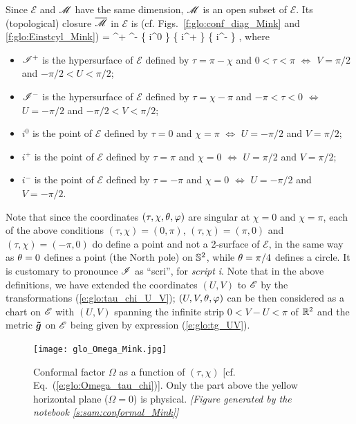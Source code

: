 Since $\mathscr{E}$ and $\mathscr{M}$ have the same dimension, $\mathscr{M}$ is an open subset of $\mathscr{E}$.
Its (topological) closure $\overline{\mathscr{M}}$ in $\mathscr{E}$ is (cf.
Figs.~\ref{f:glo:conf_diag_Mink} and \ref{f:glo:Einstcyl_Mink})
\be
    \overline{\M} = \M \cup \scri^+ \cup \scri^- \cup \left\{ i^0 \right\} \cup
            \left\{ i^+ \right\} \cup \left\{ i^- \right\} ,
\ee
where
\begin{itemize}
\item $\mathscr{I}^+$ is the hypersurface of $\mathscr{E}$ defined by
$\tau = \pi - \chi$ and $0 < \tau < \pi$ $\iff$
$V=\pi/2$ and $-\pi/2< U < \pi/2$;
\item $\mathscr{I}^-$ is the hypersurface of $\mathscr{E}$ defined by
$\tau = \chi - \pi $ and $-\pi  < \tau < 0$ $\iff$
$U=-\pi/2$ and $-\pi/2< V < \pi/2$;
\item $i^0$ is the point of $\mathscr{E}$ defined by $\tau=0$ and $\chi=\pi$
$\iff$ $U=-\pi/2$ and $V=\pi/2$;
\item $i^+$ is the point of $\mathscr{E}$ defined by $\tau=\pi$ and $\chi=0$
$\iff$ $U=\pi/2$ and $V=\pi/2$;
\item $i^-$ is the point of $\mathscr{E}$ defined by $\tau=-\pi$ and $\chi=0$
$\iff$ $U=-\pi/2$ and $V=-\pi/2$.
\end{itemize}
Note that since the coordinates $(\tau,\chi,\theta,\varphi)$ are singular at $\chi=0$ and $\chi=\pi$,
each of the above conditions $(\tau,\chi) = (0,\pi)$, $(\tau,\chi) = (\pi,0)$
and $(\tau,\chi) = (-\pi,0)$ do define a point and not a 2-surface of $\mathscr{E}$,
in the same way as $\theta=0$ defines a point (the North pole) on $\mathbb{S}^2$, while
$\theta=\pi/4$ defines a circle.
It is customary to pronounce $\mathscr{I}$ as ``scri'', for \emph{script i}.
Note that in the above definitions, we have extended the coordinates $(U,V)$
to $\mathscr{E}$ by the transformations (\ref{e:glo:tau_chi_U_V}); $(U,V,\theta,\varphi)$
can be then considered as a chart on $\mathscr{E}$ with $(U,V)$ spanning the
infinite strip $0<V-U<\pi$ of $\mathbb{R}^2$ and the metric $\bm{\tilde{g}}$ on $\mathscr{E}$
being given by expression (\ref{e:glo:tg_UV}).

\begin{figure}
\centerline{\texttt{[image: glo\_Omega\_Mink.jpg]}}
\caption[]{\label{f:glo:Omega_Mink}\footnotesize
Conformal factor $\Omega$ as a function of $(\tau,\chi)$ [cf. Eq.~(\ref{e:glo:Omega_tau_chi})].
Only the part above the yellow horizontal plane ($\Omega=0$) is physical.
\textsl{[Figure generated by the notebook \ref{s:sam:conformal_Mink}]}
}
\end{figure}

